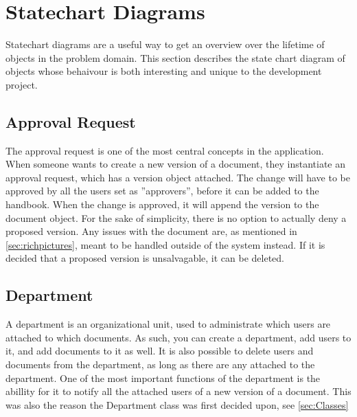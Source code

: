 \section{Statechart Diagrams} \label{sec:statechart}
Statechart diagrams are a useful way to get an overview over the lifetime of objects in the problem domain.
This section describes the state chart diagram of objects whose behaivour is both interesting and unique to the development project.

\subsection{Approval Request}
The approval request is one of the most central concepts in the application.
When someone wants to create a new version of a document, they instantiate an approval request, which has a version object attached.
The change will have to be approved by all the users set as ''approvers'', before it can be added to the handbook.
When the change is approved, it will append the version to the document object.
For the sake of simplicity, there is no option to actually deny a proposed version.
Any issues with the document are, as mentioned in \cref{sec:richpictures}, meant to be handled outside of the system instead. If it is decided that a proposed version is unsalvagable, it can be deleted.

\begin{figure}[H]
	\centering
{}
\end{figure}

\subsection{Department}
A department is an organizational unit, used to administrate which users are attached to which documents.
As such, you can create a department, add users to it, and add documents to it as well.
It is also possible to delete users and documents from the department, as long as there are any attached to the department.
One of the most important functions of the department is the abillity for it to notify all the attached users of a new version of a document.
This was also the reason the Department class was first decided upon, see \cref{sec:Classes}

